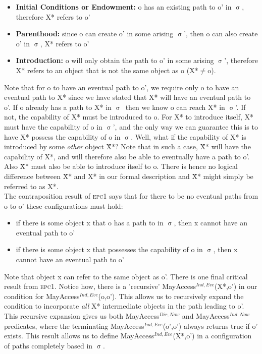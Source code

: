 \documentclass[a4paper,11pt, twoside,twocolumn]{article}
\newcommand{\loneq} {$\neq$}
\newcommand{\losigma}{$\upsigma$}
\begin{document}
\begin{itemize}
\item \textbf{Initial Conditions or Endowment:} o has an existing path to o' in \losigma, therefore X* refers to o'
\item \textbf{Parenthood:} since o can create o' in some arising \losigma', then o can also create o' in \losigma, X* refers to o'
\item \textbf{Introduction:} o will only obtain the path to o' in some arising \losigma', therefore X* refers to an object that is not the same object as o (X*\loneq o). 
\end{itemize}

Note that for o to have an eventual path to o', we require only o to have an eventual path to X* since we have stated that X* will have an eventual path to o'. If o already has a path to X* in \losigma\ then we know o can reach X* in \losigma'. If not, the capability of X* must be introduced to o. For X* to introduce itself, X* must have the capability of o in \losigma', and the only way we can guarantee this is to have X* possess the capability of o in \losigma. Well, what if the capability of X* is introduced by some \textit{other} object \~X*? Note that in such a case, \~X* will have the capability of X*, and will therefore also be able to eventually have a path to o'. Also \~X* must also be able to introduce itself to o. There is hence no logical difference between \~X* and X* in our formal description and \~X* might simply be referred to as X*.\\

The contraposition result of \textsc{epc1} says that for there to be no eventual paths from o to o' these configurations must hold:
\begin{itemize}\setlength\itemsep{0.5em}
\item if there is some object x that o has a path to in \losigma, then x cannot have an eventual path to o'
\item if there is some object x that possesses the capability of o in \losigma, then x cannot have an eventual path to o'
\end{itemize}
Note that object x can refer to the same object as o'.
There is one final critical result from \textsc{epc1}.
Notice how, there is a 'recursive' MayAccess$^{Ind,Eve}$(X*,o') in our condition for MayAccess$^{Ind,Eve}$(o,o').
This allows us to recursively expand the condition to incorporate \textit{all} X* intermediate objects in the path leading to o'. This recursive expansion gives us both MayAccess$^{Dir,Now}$ and MayAccess$^{Ind,Now}$ predicates, where the terminating MayAccess$^{Ind,Eve}$(o',o') always returns true if o' exists. This result allows us to define MayAccess$^{Ind,Eve}$(X*,o') in a configuration of paths completely based in \losigma.\\
\end{document}
